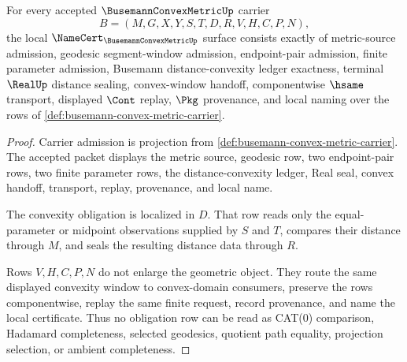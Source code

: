 \begin{theorem}
\label{thm:busemann-convex-metric-namecert-obligations}
For every accepted $\BusemannConvexMetricUp$ carrier
$$
B=(M,G,X,Y,S,T,D,R,V,H,C,P,N),
$$
the local $\NameCert_{\BusemannConvexMetricUp}$ surface consists exactly of metric-source admission, geodesic segment-window admission, endpoint-pair admission, finite parameter admission, Busemann distance-convexity ledger exactness, terminal $\RealUp$ distance sealing, convex-window handoff, componentwise $\hsame$ transport, displayed $\Cont$ replay, $\Pkg$ provenance, and local naming over the rows of \autoref{def:busemann-convex-metric-carrier}.
\end{theorem}
\begin{proof}
Carrier admission is projection from \autoref{def:busemann-convex-metric-carrier}. The accepted packet displays the metric source, geodesic row, two endpoint-pair rows, two finite parameter rows, the distance-convexity ledger, Real seal, convex handoff, transport, replay, provenance, and local name.

The convexity obligation is localized in $D$. That row reads only the equal-parameter or midpoint observations supplied by $S$ and $T$, compares their distance through $M$, and seals the resulting distance data through $R$.

Rows $V,H,C,P,N$ do not enlarge the geometric object. They route the same displayed convexity window to convex-domain consumers, preserve the rows componentwise, replay the same finite request, record provenance, and name the local certificate. Thus no obligation row can be read as CAT(0) comparison, Hadamard completeness, selected geodesics, quotient path equality, projection selection, or ambient completeness.
\end{proof}

